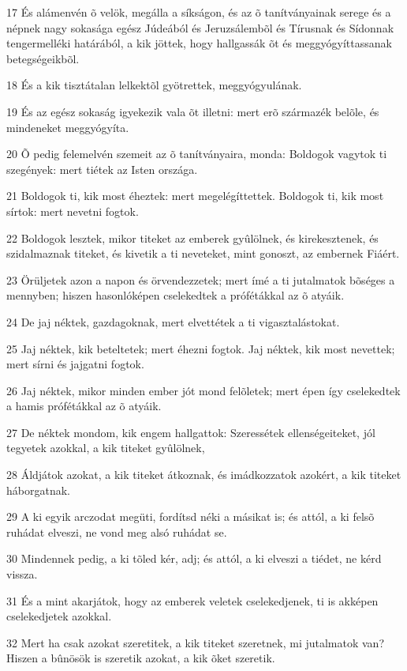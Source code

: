 \par 17 És alámenvén õ velök, megálla a síkságon, és az õ tanítványainak serege és a népnek nagy sokasága egész Júdeából és Jeruzsálembõl és Tírusnak és Sídonnak tengermelléki határából, a kik jöttek, hogy hallgassák õt és meggyógyíttassanak betegségeikbõl.
\par 18 És a kik tisztátalan lelkektõl gyötrettek, meggyógyulának.
\par 19 És az egész sokaság igyekezik vala õt illetni: mert erõ származék belõle, és mindeneket meggyógyíta.
\par 20 Õ pedig felemelvén szemeit az õ tanítványaira, monda: Boldogok vagytok ti szegények: mert tiétek az Isten országa.
\par 21 Boldogok ti, kik most éheztek: mert megelégíttettek. Boldogok ti, kik most sírtok:  mert nevetni fogtok.
\par 22 Boldogok lesztek, mikor titeket az emberek gyûlölnek, és kirekesztenek, és szidalmaznak titeket, és kivetik a ti neveteket, mint gonoszt, az embernek Fiáért.
\par 23 Örüljetek azon a napon és örvendezzetek; mert ímé a ti jutalmatok bõséges a mennyben; hiszen hasonlóképen cselekedtek a prófétákkal az õ atyáik.
\par 24 De jaj néktek, gazdagoknak, mert elvettétek a ti vigasztalástokat.
\par 25 Jaj néktek, kik beteltetek; mert éhezni fogtok. Jaj néktek, kik most nevettek; mert sírni és jajgatni fogtok.
\par 26 Jaj néktek, mikor minden ember jót mond felõletek; mert épen így cselekedtek a hamis prófétákkal az õ atyáik.
\par 27 De néktek mondom, kik engem hallgattok: Szeressétek ellenségeiteket, jól tegyetek azokkal, a kik titeket gyûlölnek,
\par 28 Áldjátok azokat, a kik titeket átkoznak, és imádkozzatok  azokért, a kik titeket háborgatnak.
\par 29 A ki egyik arczodat megüti, fordítsd néki a másikat is; és attól, a ki felsõ ruhádat elveszi, ne vond meg alsó ruhádat se.
\par 30 Mindennek pedig, a ki tõled kér, adj; és attól, a ki elveszi a tiédet, ne kérd vissza.
\par 31 És a mint akarjátok, hogy az emberek veletek cselekedjenek, ti is akképen cselekedjetek azokkal.
\par 32 Mert ha csak azokat szeretitek, a kik titeket szeretnek, mi jutalmatok van? Hiszen a bûnösök is szeretik azokat, a kik õket szeretik.

